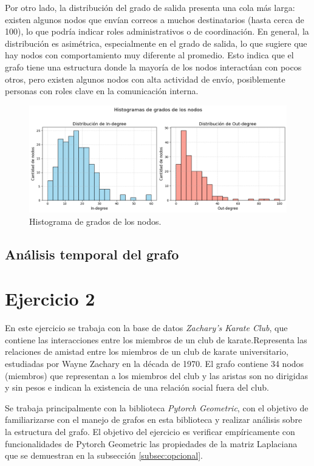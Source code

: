 \documentclass{article}
\begin{document}
Por otro lado, la distribución del grado de salida presenta una cola más larga: existen algunos nodos que envían correos a muchos destinatarios (hasta cerca de 100), lo que podría indicar roles administrativos o de coordinación. En general, la distribución es asimétrica, especialmente en el grado de salida, lo que sugiere que hay nodos con comportamiento muy diferente al promedio. Esto indica que el grafo tiene una estructura donde la mayoría de los nodos interactúan con pocos otros, pero existen algunos nodos con alta actividad de envío, posiblemente personas con roles clave en la comunicación interna.

\begin{figure}[htb]
    \centering
    \includegraphics[width=0.8\linewidth]{imagenes/ej1/histogramas_grados_nodos.png}
    \caption{Histograma de grados de los nodos.}
    \label{fig:histogramas_grados}
\end{figure}

\subsection{Análisis temporal del grafo}

\section{Ejercicio 2} \label{sec: ej2}
En este ejercicio se trabaja con la base de datos \textit{Zachary's Karate Club}, que contiene las interacciones entre los miembros de un club de karate.Representa las relaciones de amistad entre los miembros de un club de karate universitario, estudiadas por Wayne Zachary en la década de 1970. El grafo contiene 34 nodos (miembros) que representan a los miembros del club y las aristas son no dirigidas y sin pesos e indican la existencia de una relación social fuera del club.

Se trabaja principalmente con la biblioteca \textit{Pytorch Geometric}, con el objetivo de familiarizarse con el manejo de grafos en esta biblioteca y realizar análisis sobre la estructura del grafo. El objetivo del ejercicio es verificar empíricamente con funcionalidades de Pytorch Geometric las propiedades de la matriz Laplaciana que se demuestran en la subsección \ref{subsec:opcional}.
\end{document}
